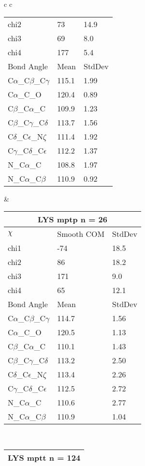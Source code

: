\begin{longtable}{ c c }
\begin{tabular}{ l l l }
  chi2 & 73 & 14.9 \\ 
  chi3 & 69 & 8.0 \\ 
  chi4 & 177 & 5.4 \\ \midrule
  Bond Angle   & Mean     & StdDev \\ \midrule
  C$\alpha$\_C$\beta$\_C$\gamma$ & 115.1 & 1.99\\
  C$\alpha$\_C\_O & 120.4 & 0.89\\
  C$\beta$\_C$\alpha$\_C & 109.9 & 1.23\\
  C$\beta$\_C$\gamma$\_C$\delta$ & 113.7 & 1.56\\
  C$\delta$\_C$\epsilon$\_N$\zeta$ & 111.4 & 1.92\\
  C$\gamma$\_C$\delta$\_C$\epsilon$ & 112.2 & 1.37\\
  N\_C$\alpha$\_C & 108.8 & 1.97\\
  N\_C$\alpha$\_C$\beta$ & 110.9 & 0.92\\
  \bottomrule
  \end{tabular}
  &
  \begin{tabular}{ l l l }
  \toprule
  \multicolumn{3}{c}{LYS \textbf{mptp} n = 26} \\ \toprule
  $\chi$       & Smooth COM & StdDev \\ \midrule
  chi1 & -74 & 18.5 \\ 
  chi2 & 86 & 18.2 \\ 
  chi3 & 171 & 9.0 \\ 
  chi4 & 65 & 12.1 \\ \midrule
  Bond Angle   & Mean     & StdDev \\ \midrule
  C$\alpha$\_C$\beta$\_C$\gamma$ & 114.7 & 1.56\\
  C$\alpha$\_C\_O & 120.5 & 1.13\\
  C$\beta$\_C$\alpha$\_C & 110.1 & 1.43\\
  C$\beta$\_C$\gamma$\_C$\delta$ & 113.2 & 2.50\\
  C$\delta$\_C$\epsilon$\_N$\zeta$ & 113.4 & 2.26\\
  C$\gamma$\_C$\delta$\_C$\epsilon$ & 112.5 & 2.72\\
  N\_C$\alpha$\_C & 110.6 & 2.77\\
  N\_C$\alpha$\_C$\beta$ & 110.9 & 1.04\\
  \bottomrule
  \end{tabular}
  \\
  \begin{tabular}{ l l l }
  \toprule
  \multicolumn{3}{c}{LYS \textbf{mptt} n = 124} \\ \toprule

\end{tabular}
\end{longtable}
